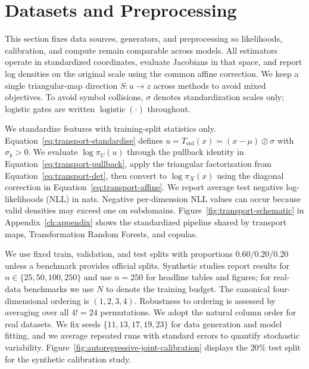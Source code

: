 \documentclass[11pt,a4paper,twoside]{book}\usepackage[]{graphicx}\usepackage[]{xcolor}
\begin{document}
\section{Datasets and Preprocessing}\label{sec:datasets-preprocessing}

This section fixes data sources, generators, and preprocessing so likelihoods, calibration, and compute remain comparable across models. All estimators operate in standardized coordinates, evaluate Jacobians in that space, and report log densities on the original scale using the common affine correction. We keep a single triangular-map direction $S:u \rightarrow z$ across methods to avoid mixed objectives. To avoid symbol collisions, $\sigma$ denotes standardization scales only; logistic gates are written $\operatorname{logistic}(\cdot)$ throughout.

We standardize features with training-split statistics only. Equation~\eqref{eq:transport-standardise} defines $u = T_{\mathrm{std}}(x) = (x-\mu)\oslash \sigma$ with $\sigma_k > 0$. We evaluate $\log \pi_U(u)$ through the pullback identity in Equation~\eqref{eq:transport-pullback}, apply the triangular factorization from Equation~\eqref{eq:transport-det}, then convert to $\log \pi_X(x)$ using the diagonal correction in Equation~\eqref{eq:transport-affine}. We report average test negative log-likelihoods (NLL) in nats. Negative per-dimension NLL values can occur because valid densities may exceed one on subdomains. Figure~\ref{fig:transport-schematic} in Appendix~\ref{ch:appendix} shows the standardized pipeline shared by transport maps, Transformation Random Forests, and copulas.

We use fixed train, validation, and test splits with proportions $0.60/0.20/0.20$ unless a benchmark provides official splits. Synthetic studies report results for $n \in \{25, 50, 100, 250\}$ and use $n=250$ for headline tables and figures; for real-data benchmarks we use $N$ to denote the training budget. The canonical four-dimensional ordering is $(1,2,3,4)$. Robustness to ordering is assessed by averaging over all $4! = 24$ permutations. We adopt the natural column order for real datasets. We fix seeds $\{11, 13, 17, 19, 23\}$ for data generation and model fitting, and we average repeated runs with standard errors to quantify stochastic variability. Figure~\ref{fig:autoregressive-joint-calibration} displays the $20\%$ test split for the synthetic calibration study.
\end{document}

